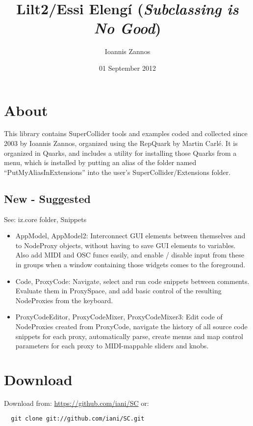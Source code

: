 \documentclass[11pt, a4paper]{scrartcl}
\begin{document}
\title{Lilt2/Essi Eleng\'i (\emph{Subclassing is No Good})}
\author{Ioannis Zannos}
\date{01 September 2012}
\maketitle


\section*{About}
\label{sec-1}


This library contains SuperCollider tools and examples coded and collected since 2003 by Ioannis Zannos, organized using the RepQuark by Martin Carl\'e. It is organized in Quarks, and includes a utility for installing those Quarks from a menu, which is installed by putting an alias of the folder named ``PutMyAliasInExtensions'' into the user's SuperCollider/Extensions folder. 
\subsection*{New - Suggested}
\label{sec-1_1}


See: iz.core folder, Snippets

\begin{itemize}
\item AppModel, AppModel2: Interconnect GUI elements between themselves and to NodeProxy objects, without having to save GUI elements to variables. Also add MIDI and OSC funcs easily, and enable / disable input from these in groups when a window containing those widgets comes to the foreground.
\item Code, ProxyCode: Navigate, select and run code snippets between comments. Evaluate them in ProxySpace, and add basic control of the resulting NodeProxies from the keyboard.
\item ProxyCodeEditor, ProxyCodeMixer, ProxyCodeMixer3: Edit code of NodeProxies created from ProxyCode, navigate the history of all source code snippets for each proxy, automatically parse, create menus and map control parameters for each proxy to MIDI-mappable sliders and knobs.
\end{itemize}
\section*{Download}
\label{sec-2}


Download from: \href{https://github.com/iani/SC}{https://github.com/iani/SC}
or:
\begin{verbatim}
  git clone git://github.com/iani/SC.git
\end{verbatim}
\end{document}
